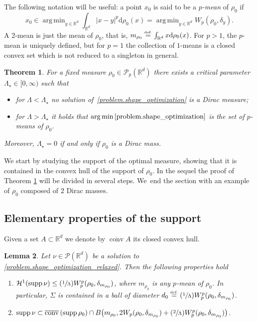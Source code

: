 \documentclass[10pt]{amsart}
\newcommand{\Psfrac}[2]{(\sfrac{#1}{#2})}
\newtheorem{theorem}{Theorem}[section]
\newtheorem{lemma}[theorem]{Lemma}
\theoremstyle{definition}
\newcommand{\eqdef}{\ensuremath{\stackrel{\mbox{\upshape\tiny def.}}{=}}}
\newcommand\cH{\mathcal{H}}
\newcommand{\RR}{\mathbb{R}}
\DeclareMathOperator*{\argmin}{arg\,min}
\DeclareMathOperator{\supp}{supp}
\DeclareMathOperator{\conv}{conv}
\newcommand{\cconv}{\overline{\conv}}
\newcommand\dd{\mathrm{d}}
\begin{document}
The following notation will be useful: a point $x_0$ is said to be a \emph{$p$-mean} of $\rho_0$ if
\[
x_0 \in
\argmin_{y \in \RR^d} \int_{\RR^d}|x - y|^p\dd \rho_0(x)
=
\argmin_{y \in \RR^d} W_p(\rho_0, \delta_y).
\]
A 2-mean is just the mean of $\rho_0$, that is, $m_{\rho_0} \eqdef \int_{\RR^d}x \dd \rho_0(x)$. For $p>1$, the $p$-mean is uniquely defined, but for $p=1$ the collection of $1$-means is a closed convex set which is not reduced to a singleton in general.

\begin{theorem}\label{theorem.when_sols_are_diracs}
For a fixed measure $\rho_0 \in \mathcal{P}_p(\RR^d)$ there exists a critical parameter $\Lambda_\star \in [0, \infty)$ such that
\begin{itemize}
\item for $\Lambda < \Lambda_\star$ no solution of~\eqref{problem.shape_optimization}
is a Dirac measure;
\item for $\Lambda > \Lambda_\star$ it holds that
$\argmin\eqref{problem.shape_optimization}$
is the set of $p$-means of $\rho_0$.
\end{itemize}
Moreover, $\Lambda_\star=0$ if and only if $\rho_0$ is a Dirac mass.
\end{theorem}

We start by studying the support of the optimal measure, showing that it is contained in the convex hull of the support of $\rho_0$. In the sequel the proof of Theorem \ref{theorem.when_sols_are_diracs} will be divided in several steps. We~end the section with an example of $\rho_0$ composed of $2$ Dirac masses.

\subsection{Elementary properties of the support}
Given a set $A \subset \RR^d$ we denote by $\cconv A$ its closed convex hull.
\begin{lemma}\label{lem.convexhull}
Let $\nu \in\mathcal{P}(\RR^d)$ be a solution to \eqref{problem.shape_optimization_relaxed}. Then the following properties hold
\begin{enumerate}
\item
$\cH^1(\supp \nu)\leq \Psfrac{1}{\Lambda}W^p_p(\rho_0,\delta_{m_{\rho_0}})$, where $m_{\rho_0}$ is any $p$-mean of $\rho_0$. In particular, $\Sigma$ is contained in a ball of diameter $d_0\eqdef \Psfrac{1}{\Lambda}W^p_p(\rho_0,\delta_{m_{\rho_0}})$.
\item
$\supp \nu \subset \cconv\left(\supp \rho_0\right)
\cap B\big({m_{\rho_0}},2W_p(\rho_0,\delta_{m_{\rho_0}})
+ \Psfrac{2}{\Lambda}W_p^p(\rho_0,\delta_{m_{\rho_0}})\big)$.
\end{enumerate}
\end{lemma}
\end{document}
